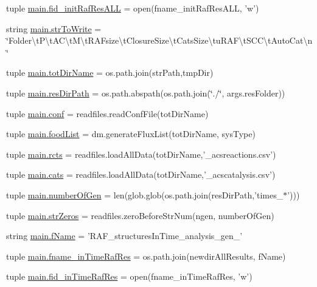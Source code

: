 \begin{DoxyCompactItemize}
\item 
tuple \hyperlink{a00151_a45aeb03f0d9cc30cb0a490354fd76d6c}{main.\-fid\-\_\-init\-Raf\-Res\-A\-L\-L} = open(fname\-\_\-init\-Raf\-Res\-A\-L\-L, 'w')
\item 
string \hyperlink{a00151_ab9980383a541b03ce91d6b812a4bf79a}{main.\-str\-To\-Write} = \char`\"{}Folder\textbackslash{}t\-P\textbackslash{}t\-A\-C\textbackslash{}t\-M\textbackslash{}t\-R\-A\-Fsize\textbackslash{}t\-Closure\-Size\textbackslash{}t\-Cats\-Size\textbackslash{}tu\-R\-A\-F\textbackslash{}t\-S\-C\-C\textbackslash{}t\-Auto\-Cat\textbackslash{}n\char`\"{}
\item 
tuple \hyperlink{a00151_a82f73a786e4c93e909fd689ee0d0812e}{main.\-tot\-Dir\-Name} = os.\-path.\-join(str\-Path,tmp\-Dir)
\item 
tuple \hyperlink{a00151_a93d7d68ada532b3cedaab103283ab91a}{main.\-res\-Dir\-Path} = os.\-path.\-abspath(os.\-path.\-join(\char`\"{}./\char`\"{}, args.\-res\-Folder))
\item 
tuple \hyperlink{a00151_adc567db25548116293968a9102beab98}{main.\-conf} = readfiles.\-read\-Conf\-File(tot\-Dir\-Name)
\item 
tuple \hyperlink{a00151_a07ce1f0750b6dc5baff89792fc194152}{main.\-food\-List} = dm.\-generate\-Flux\-List(tot\-Dir\-Name, sys\-Type)
\item 
tuple \hyperlink{a00151_ac2fe1ed3228b8e616f25ccfbe4cc7dc4}{main.\-rcts} = readfiles.\-load\-All\-Data(tot\-Dir\-Name,'\-\_\-acsreactions.\-csv')
\item 
tuple \hyperlink{a00151_adc0282a6415a88834556e66807bcc800}{main.\-cats} = readfiles.\-load\-All\-Data(tot\-Dir\-Name,'\-\_\-acscatalysis.\-csv')
\item 
tuple \hyperlink{a00151_aabf82b9e9c2293000a67162becdd440d}{main.\-number\-Of\-Gen} = len(glob.\-glob(os.\-path.\-join(res\-Dir\-Path,'times\-\_\-$\ast$')))
\item 
tuple \hyperlink{a00151_a02d59015bebcf0ad1bc1162efca757c3}{main.\-str\-Zeros} = readfiles.\-zero\-Before\-Str\-Num(ngen, number\-Of\-Gen)
\item 
string \hyperlink{a00151_a9fff4b23f9489649601960dabc4a6cdd}{main.\-f\-Name} = 'R\-A\-F\-\_\-structures\-In\-Time\-\_\-analysis\-\_\-gen\-\_\-'
\item 
tuple \hyperlink{a00151_a64d742d069748ddd43a9378ef918d0b1}{main.\-fname\-\_\-in\-Time\-Raf\-Res} = os.\-path.\-join(newdir\-All\-Results, f\-Name)
\item 
tuple \hyperlink{a00151_ab82095abcedb97b7abf8e003f4724d0c}{main.\-fid\-\_\-in\-Time\-Raf\-Res} = open(fname\-\_\-in\-Time\-Raf\-Res, 'w')

\end{DoxyCompactItemize}
